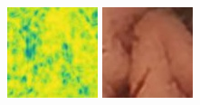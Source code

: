 \documentclass[conference]{IEEEtran}
\begin{document}
\begin{figure}[!t]
        \vfill
        \includegraphics[width=\linewidth]{Figures/906/906_SRGAN_ssim.jpg}
        
    \endminipage\hfill
        \centering
        \includegraphics[width=\linewidth]{Figures/906/906_cycleGAN.jpg}
        

\end{figure}
\end{document}
